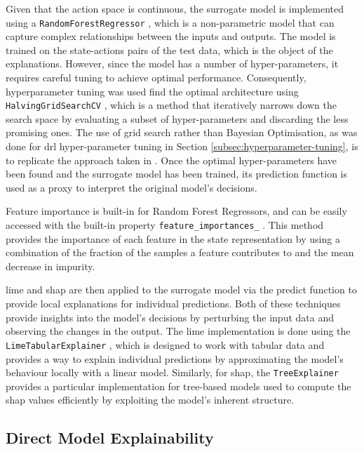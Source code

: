 Given that the action space is continuous, the surrogate model is implemented using a \texttt{RandomForestRegressor} \cite{sklearnRandomForest}, which is a non-parametric model that can capture complex relationships between the inputs and outputs. The model is trained on the state-actions pairs of the test data, which is the object of the explanations. However, since the model has a number of hyper-parameters, it requires careful tuning to achieve optimal performance. Consequently, hyperparameter tuning was used find the optimal architecture using \texttt{HalvingGridSearchCV} \cite{sklearnHalvingGridSearch}, which is a method that iteratively narrows down the search space by evaluating a subset of hyper-parameters and discarding the less promising ones. The use of grid search rather than Bayesian Optimisation, as was done for \acrshort{drl} hyper-parameter tuning in Section \ref{subsec:hyperparameter-tuning}, is to replicate the approach taken in \cite{de-La-Rica-Escudero2025}. Once the optimal hyper-parameters have been found and the surrogate model has been trained, its prediction function is used as a proxy to interpret the original model's decisions.

Feature importance is built-in for Random Forest Regressors, and can be easily accessed with the built-in property \texttt{feature\_importances\_} \cite{sklearnFeatureImportance}. This method provides the importance of each feature in the state representation by using a combination of the fraction of the samples a feature contributes to and the mean decrease in impurity.

\acrshort{lime} and \acrshort{shap} are then applied to the surrogate model via the predict function to provide local explanations for individual predictions. Both of these techniques provide insights into the model's decisions by perturbing the input data and observing the changes in the output. The \acrshort{lime} implementation is done using the \texttt{LimeTabularExplainer} \cite{LimeTabularExplainer}, which is designed to work with tabular data and provides a way to explain individual predictions by approximating the model's behaviour locally with a linear model. Similarly, for \acrshort{shap}, the \texttt{TreeExplainer} \cite{ShapTreeExplainer} provides a particular implementation for tree-based models used to compute the \acrshort{shap} values efficiently by exploiting the model's inherent structure.

\subsection{Direct Model Explainability} \label{subsec:direct_model_explainability}

